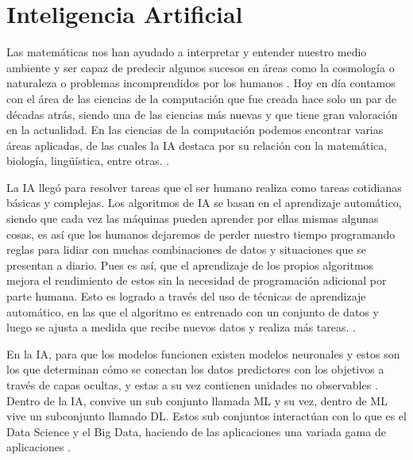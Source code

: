 \section{Inteligencia Artificial}
Las matemáticas nos han ayudado a interpretar y entender nuestro medio ambiente y ser capaz de predecir algunos sucesos en áreas como la cosmología o naturaleza o problemas incomprendidos por los humanos \cite{Grazia2022}. Hoy en día contamos con el área de las ciencias de la computación que fue creada hace solo un par de décadas atrás, siendo una de las ciencias más nuevas y que tiene gran valoración en la actualidad. En las ciencias de la computación podemos encontrar varias áreas aplicadas, de las cuales la IA destaca por su relación con la matemática, biología, lingüística, entre otras. \cite{Grazia2022}.\\
\par La IA llegó para resolver tareas que el ser humano realiza como tareas cotidianas básicas y complejas. Los algoritmos de IA se basan en el aprendizaje automático, siendo que cada vez las máquinas pueden aprender por ellas mismas algunas cosas, es así que los humanos dejaremos de perder nuestro tiempo programando reglas para lidiar con muchas combinaciones de datos y situaciones que se presentan a diario. Pues es así, que el aprendizaje de los propios algoritmos mejora el rendimiento de estos sin la necesidad de programación adicional por parte humana. Esto es logrado a través del uso de técnicas de aprendizaje automático, en las que el algoritmo es entrenado con un conjunto de datos y luego se ajusta a medida que recibe nuevos datos y realiza más tareas. \cite{Carola}.\\
\par En la IA, para que los modelos funcionen existen modelos neuronales y estos son los que determinan cómo se conectan los datos predictores con los objetivos a través de capas ocultas, y estas a su vez contienen unidades no observables \cite{IBM}. Dentro de la IA, convive un sub conjunto llamada ML y su vez, dentro de ML vive un subconjunto llamado DL. Estos sub conjuntos interactúan con lo que es el Data Science y el Big Data, haciendo de las aplicaciones una variada gama de aplicaciones \cite{moreno2021diseno}.\\


